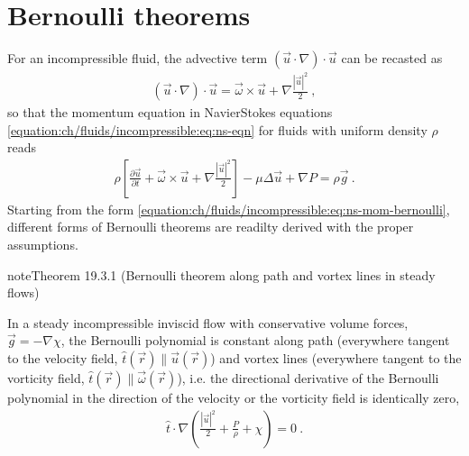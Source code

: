\documentclass[letterpaper,10pt,english]{jupyterBook}
\begin{document}
\section{Bernoulli theorems}
\label{\detokenize{ch/fluids/incompressible:bernoulli-theorems}}\label{\detokenize{ch/fluids/incompressible:id1}}
\sphinxAtStartPar
For an incompressible fluid, the advective term \((\vec{u} \cdot \nabla) \cdot \vec{u}\) can be recasted as
\begin{equation*}
\begin{split}(\vec{u} \cdot \nabla) \cdot \vec{u} = \vec{\omega} \times \vec{u} + \nabla \frac{|\vec{u}|^2}{2} \ ,\end{split}
\end{equation*}
\sphinxAtStartPar
so that the momentum equation in Navier\sphinxhyphen{}Stokes equations \eqref{equation:ch/fluids/incompressible:eq:ns-eqn} for fluids with uniform density \(\rho\) reads
\begin{equation}\label{equation:ch/fluids/incompressible:eq:ns-mom-bernoulli}
\begin{split} \rho \left[ \frac{\partial \vec{u}}{\partial t} + \vec{\omega} \times \vec{u} + \nabla \frac{|\vec{u}|^2}{2} \right] - \mu \Delta \vec{u} + \nabla P = \rho \vec{g} \ .\end{split}
\end{equation}
\sphinxAtStartPar
Starting from the form \eqref{equation:ch/fluids/incompressible:eq:ns-mom-bernoulli}, different forms of Bernoulli theorems are readilty derived with the proper assumptions.
\label{ch/fluids/incompressible:theorem-0}
\begin{sphinxadmonition}{note}{Theorem 19.3.1 (Bernoulli theorem along path and vortex lines in steady flows)}



\sphinxAtStartPar
In a steady incompressible inviscid flow with conservative volume forces, \(\vec{g} = - \nabla \chi\), the Bernoulli polynomial is constant along path (everywhere tangent to the velocity field, \(\hat{t}(\vec{r}) \parallel \vec{u}(\vec{r})\)) and vortex lines (everywhere tangent to the vorticity field, \(\hat{t}(\vec{r}) \parallel \vec{\omega}(\vec{r})\)), i.e. the directional derivative of the Bernoulli polynomial in the direction of the velocity or the vorticity field is identically zero,
\begin{equation*}
\begin{split}\hat{t} \cdot \nabla \left( \frac{|\vec{u}|^2}{2} + \frac{P}{\rho} + \chi \right) = 0 \ .\end{split}
\end{equation*}\end{sphinxadmonition}
\end{document}

